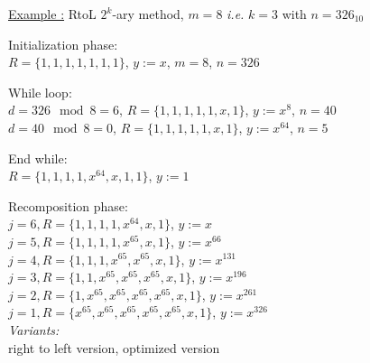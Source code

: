 \begin{itemize}
			\underline{Example :} RtoL $2^k$-ary method, $m=8$ \textit{i.e.} $k=3$ with $n=326_{10}$
			
			Initialization phase:\\
			$R = \{1,1,1,1,1,1,1\}$, $y:= x$, $m=8$, $n=326$

			While loop:\\
			$d = 326 \mod 8 = 6$, $R = \{1,1,1,1,1,x,1\}$, $y:= x^8$,  $n=40$\\
			$d =  40 \mod 8 = 0$, $R = \{1,1,1,1,1,x,1\}$, $y:= x^{64}$, $n= 5$

			End while:\\
			$R = \{1,1,1,1,x^{64},x,1,1\}$, $y:= 1$

			Recomposition phase:\\
			$j=6, R = \{1,		1,		1,		1,			x^{64},	x,	1\}$, $y:= x$\\
			$j=5, R = \{1,		1,		1,		1,			x^{65},	x,	1\}$, $y:= x^{66}$\\
			$j=4, R = \{1,		1,		1,		x^{65},		x^{65},	x,	1\}$, $y:= x^{131}$\\
			$j=3, R = \{1,		1,		x^{65},	x^{65},		x^{65},	x,	1\}$, $y:= x^{196}$\\
			$j=2, R = \{1,		x^{65},	x^{65},	x^{65},		x^{65},	x,	1\}$, $y:= x^{261}$\\
			$j=1, R = \{x^{65},	x^{65},	x^{65},	x^{65},		x^{65},	x,	1\}$, $y:= x^{326}$\\


		\textit{Variants:}\\			
			 right to left version, optimized version 
\end{itemize}		 